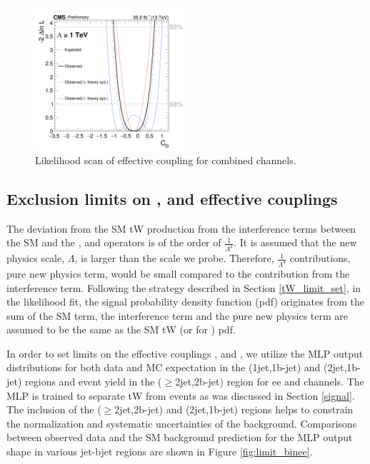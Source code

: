 \begin{figure}[ht]
  \begin{center}
      \includegraphics[width=0.49\textwidth]{figures/tW/fig/scan_all_plot/Cg_combined_scan.png}
    \caption{Likelihood scan of \CG effective coupling for combined channels.
    \label{fig:EFT_scan_CG}}
  \end{center}
\end{figure}

\clearpage
\subsection {Exclusion limits on \texorpdfstring{\CtG, \Cphiq and \CtW effective couplings}{}}
The deviation from the SM tW production from the interference terms between the
SM and the \OtG, \Ophiq and \OtW operators is of the order of $\frac{1}{\Lambda^2}$.
It is assumed that the new physics scale, $\Lambda$, is larger  than the scale we  probe. Therefore, $\frac{1}{\Lambda^4}$
contributions, pure new physics term, would be small compared to the contribution from the interference term.
Following the strategy described in Section \ref{tW_limit_set}, in the likelihood fit, the signal probability density function (pdf) originates from the sum of the SM term, the interference term and the pure new physics term are assumed to be the same as the SM tW (or \ttbar for \OtG) pdf.


In order to set limits on the effective couplings \CtG, \Cphiq and \CtW, we utilize the MLP output distributions for both data and MC expectation in the (1jet,1b-jet)
and (2jet,1b-jet) regions and event yield in the ($\geq$2jet,2b-jet) region for ee and \mumu channels.
The MLP is trained to separate tW from \ttbar events as was discussed in Section \ref{signal}.
The inclusion of the ($\geq$2jet,2b-jet) and (2jet,1b-jet) regions helps to constrain the normalization and systematic uncertainties of the \ttbar background.
Comparisons between observed data and the SM background prediction for the MLP output shape in various jet-bjet regions are shown in Figure \ref{fig:limit_binee}.


